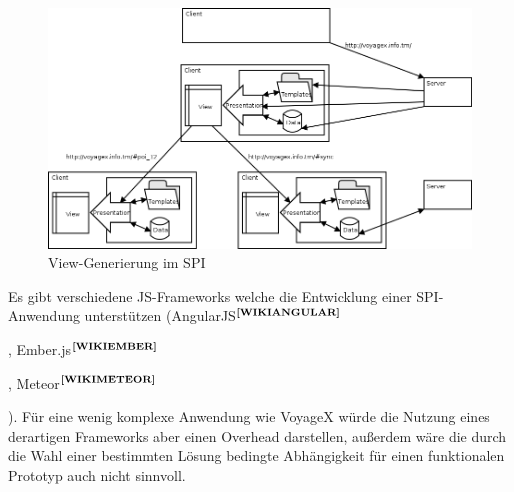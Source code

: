 \enlargethispage{3\baselineskip} %
  \begin{figure}[H]
  	\begin{adjustwidth}{-0.6cm}{0.6cm}
      \centering
	  \includegraphics[scale=0.48]{bilder/spi.png}
  	  \caption{View-Generierung im SPI}
  	  \label{fig:VIEW_GEN_SPI}
  	 \end{adjustwidth}
  \end{figure}
\noindent
Es gibt verschiedene JS-Frameworks welche die Entwicklung einer SPI-Anwendung unterstützen (AngularJS$^{\textbf{\ref{WIKIANGULAR}}}$%
\addtocounter{footnote}{1}%
,  Ember.js$^{\textbf{\ref{WIKIEMBER}}}$%
\addtocounter{footnote}{1}%
, Meteor$^{\textbf{\ref{WIKIMETEOR}}}$%
\addtocounter{footnote}{1}%
). Für eine wenig komplexe Anwendung wie VoyageX würde die Nutzung eines derartigen Frameworks aber einen Overhead darstellen, außerdem wäre die durch die Wahl einer bestimmten Lösung bedingte Abhängigkeit für einen funktionalen Prototyp auch nicht sinnvoll.


